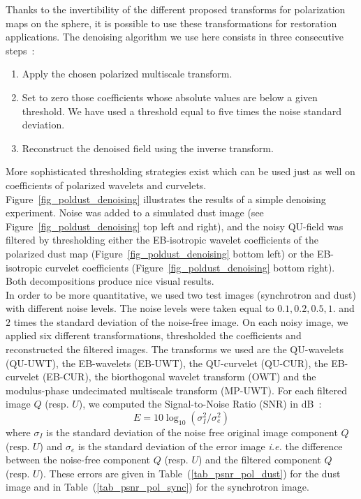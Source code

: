 Thanks to the invertibility of the different proposed transforms for polarization maps on the sphere, it is possible to use these transformations for restoration applications. 
The denoising algorithm we use here consists in three consecutive steps~:\\
\begin{enumerate}
\item Apply the chosen polarized multiscale transform. 
\item Set to zero those coefficients whose absolute values are below a given threshold. We have used a threshold equal to five times the noise standard deviation.
\item Reconstruct the denoised field using the inverse transform.\\
\end{enumerate}

More sophisticated thresholding strategies exist \citep{starck:book06} which can be used just as well on coefficients of polarized wavelets and curvelets.\\

Figure~\ref{fig_poldust_denoising} illustrates  the results of a simple denoising experiment. 
Noise was added to a simulated dust image (see Figure~\ref{fig_poldust_denoising} top left and right), 
and the noisy QU-field was filtered  by thresholding either the EB-isotropic wavelet coefficients 
of the polarized dust map (Figure~\ref{fig_poldust_denoising} bottom left) or the EB-isotropic 
curvelet coefficients (Figure~\ref{fig_poldust_denoising} bottom right). Both decompositions produce nice visual results.\\

In order to be more quantitative, we used two test images (synchrotron and dust) with different noise levels. 
The noise levels were taken equal to $0.1,0.2,0.5,1.$ and $2$ times the standard deviation of the noise-free image.
On each noisy image, we applied six different transformations, thresholded  the coefficients and reconstructed 
the filtered images. The transforms we used are the QU-wavelets (QU-UWT), the EB-wavelets (EB-UWT), the QU-curvelet (QU-CUR), 
the EB-curvelet (EB-CUR), the biorthogonal wavelet transform (OWT) and the modulus-phase undecimated multiscale transform (MP-UWT).
For each filtered image  $Q$  (resp. $U$), we computed the Signal-to-Noise Ratio (SNR) in dB~:
\begin{equation}
E  = 10 \log_{10}(  \sigma_I^2 /  \sigma_e^2 )
\end{equation}
where $\sigma_I$ is the standard deviation  of the noise free original image component $Q$ (resp. $U$) and 
$\sigma_e$ is the standard deviation of the error image \textit{i.e.} the difference between the noise-free component $Q$ 
(resp. $U$) and the filtered component $Q$ (resp. $U$). These errors are given in Table~(\ref{tab_psnr_pol_dust}) 
for the dust image and in Table~(\ref{tab_psnr_pol_sync}) for the synchrotron image.\\

